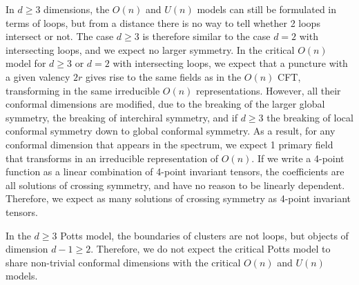 \documentclass[12pt, a4paper]{article}
\theoremstyle{break}
\begin{document}
In $d\geq 3$ dimensions, the $O(n)$ and $U(n)$ models can still be formulated in terms of loops, but
from a distance there is no way to tell whether 2 loops intersect or not. The case $d\geq 3$ is therefore similar to the case $d=2$ with intersecting loops, and we expect no larger symmetry. 
In the critical $O(n)$ model for $d\geq 3$ or $d=2$ with intersecting loops, we expect that a puncture with a given valency $2r$ gives rise to the same fields as in the $O(n)$ CFT, transforming in the same irreducible $O(n)$ representations. However, all their conformal dimensions are modified, due to the breaking of the larger global symmetry, the breaking of interchiral symmetry, and if $d\geq 3$ the breaking of local conformal symmetry down to global conformal symmetry. As a result, for any conformal dimension that appears in the spectrum, we expect 1 primary field that transforms in an irreducible representation of $O(n)$. If we write a 4-point function as a linear combination of 4-point invariant tensors, the coefficients are all solutions of crossing symmetry, and have no reason to be linearly dependent. Therefore, we expect as many solutions of crossing symmetry as 4-point invariant tensors. 

In the $d\geq 3$ Potts model, the boundaries of clusters are not loops, but objects of dimension $d-1\geq 2$. Therefore, we do not expect the critical Potts model to share non-trivial conformal dimensions with the critical $O(n)$ and $U(n)$ models. 





\printindex
\end{document}

